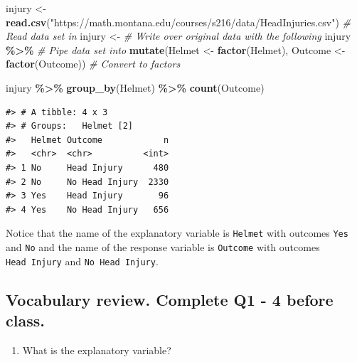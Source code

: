 \documentclass[
]{report}
\newenvironment{Shaded}{\begin{snugshade}}{\end{snugshade}}
\newcommand{\CommentTok}[1]{\textcolor[rgb]{0.56,0.35,0.01}{\textit{#1}}}
\newcommand{\KeywordTok}[1]{\textcolor[rgb]{0.13,0.29,0.53}{\textbf{#1}}}
\newcommand{\NormalTok}[1]{#1}
\newcommand{\OperatorTok}[1]{\textcolor[rgb]{0.81,0.36,0.00}{\textbf{#1}}}
\newcommand{\StringTok}[1]{\textcolor[rgb]{0.31,0.60,0.02}{#1}}
\providecommand{\tightlist}{%
  \setlength{\itemsep}{0pt}\setlength{\parskip}{0pt}}
\begin{document}
\begin{Shaded}
\begin{Highlighting}[]
\NormalTok{injury \textless{}{-}}\StringTok{ }\KeywordTok{read.csv}\NormalTok{(}\StringTok{"https://math.montana.edu/courses/s216/data/HeadInjuries.csv"}\NormalTok{) }\CommentTok{\# Read data set in}
\NormalTok{injury \textless{}{-}}\StringTok{ }\CommentTok{\# Write over original data with the following}
\StringTok{  }\NormalTok{injury }\OperatorTok{\%\textgreater{}\%}\StringTok{ }\CommentTok{\# Pipe data set into}
\StringTok{  }\KeywordTok{mutate}\NormalTok{(Helmet \textless{}{-}}\StringTok{ }\KeywordTok{factor}\NormalTok{(Helmet),}
\NormalTok{         Outcome \textless{}{-}}\StringTok{ }\KeywordTok{factor}\NormalTok{(Outcome)) }\CommentTok{\# Convert to factors}

\NormalTok{injury }\OperatorTok{\%\textgreater{}\%}\StringTok{ }\KeywordTok{group\_by}\NormalTok{(Helmet) }\OperatorTok{\%\textgreater{}\%}\StringTok{ }\KeywordTok{count}\NormalTok{(Outcome)}
\end{Highlighting}
\end{Shaded}

\begin{verbatim}
#> # A tibble: 4 x 3
#> # Groups:   Helmet [2]
#>   Helmet Outcome            n
#>   <chr>  <chr>          <int>
#> 1 No     Head Injury      480
#> 2 No     No Head Injury  2330
#> 3 Yes    Head Injury       96
#> 4 Yes    No Head Injury   656
\end{verbatim}

Notice that the name of the explanatory variable is \texttt{Helmet} with outcomes \texttt{Yes} and \texttt{No} and the name of the response variable is \texttt{Outcome} with outcomes \texttt{Head\ Injury} and \texttt{No\ Head\ Injury}.

\hypertarget{vocabulary-review.-complete-q1---4-before-class.}{%
\subsection*{Vocabulary review. Complete Q1 - 4 before class.}\label{vocabulary-review.-complete-q1---4-before-class.}}

\begin{enumerate}
\def\labelenumi{\arabic{enumi}.}
\tightlist
\item
  What is the explanatory variable?
\end{enumerate}
\end{document}
